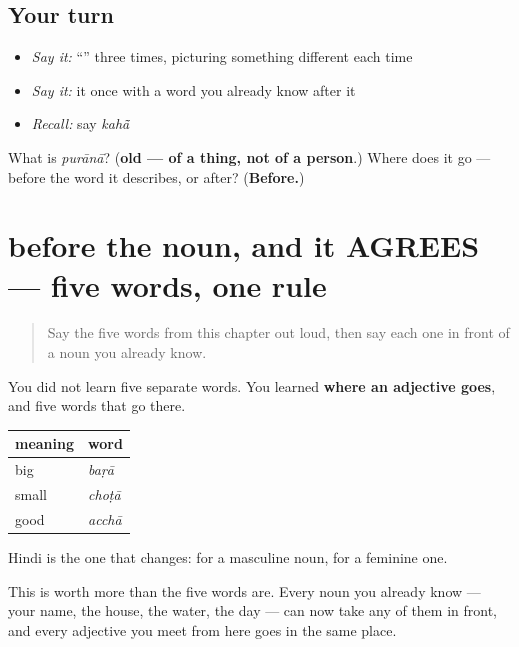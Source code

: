 \subsection*{Your turn}
\begin{itemize}
\raggedright
  \item \emph{Say it:} \textquotedblleft{}\textquotedblright{} three times, picturing something different each time
  \item \emph{Say it:} it once with a word you already know after it
  \item \emph{Recall:} say \emph{kahā̃}
\end{itemize}

\begin{tcolorbox}[breakable,colback=teal!4,colframe=teal!35!black,title={Before you move on}]
What is \emph{purānā}? (\textbf{old — of a thing, not of a person}.) Where does it go — before the word it describes, or after? (\textbf{Before.})
\end{tcolorbox}
\section[before the noun, and it AGREES]{before the noun, and it AGREES — five words, one rule}

\label{lesson:HI-C41-adjective-system}



\begin{quote}
Say the five words from this chapter out loud, then say each one in front of a noun you already know.
\end{quote}

\begin{grammarlens}[title={Grammar lens: where an adjective goes}]
You did not learn five separate words. You learned \textbf{where an adjective goes}, and five words that go there.

\noindent
\begin{tabularx}{\linewidth}{@{}>{\raggedright\arraybackslash}X>{\raggedright\arraybackslash}X@{}}
\toprule
\textbf{meaning} & \textbf{word} \\
\midrule
big & \textbf{\hi{बड़ा}} \emph{baṛā} \\
small & \textbf{\hi{छोटा}} \emph{choṭā} \\
good & \textbf{\hi{अच्छा}} \emph{acchā} \\
\bottomrule
\end{tabularx}

Hindi is the one that changes:  for a masculine noun,  for a feminine one.

This is worth more than the five words are. Every noun you already know — your name, the house, the water, the day — can now take any of them in front, and every adjective you meet from here goes in the same place.
\end{grammarlens}

